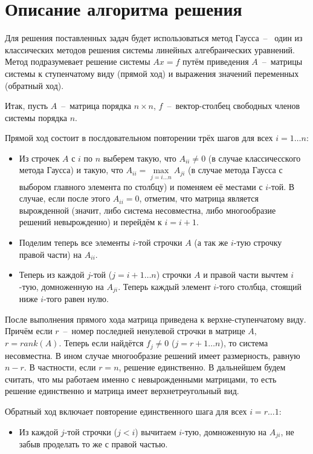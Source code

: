 \newpage
\section{Описание алгоритма решения}

Для решения поставленных задач будет использоваться метод Гаусса~--~
один из классических методов решения системы линейных алгебраических уравнений.
Метод подразумевает решение системы $Ax = f$ путём приведения $A$~--~матрицы системы
к ступенчатому виду (прямой ход) и выражения значений переменных (обратный ход).
\par

Итак, пусть $A$~--~матрица порядка $n \times n$, $f$~--~вектор-столбец свободных членов системы порядка $n$.
\par

Прямой ход состоит в послдовательном повторении трёх шагов для всех $i = 1 \ldots n$:
\begin{itemize}
    \item Из строчек $A$ с $i$ по $n$ выберем такую, что $A_{ii} \ne 0$ (в случае классичесского метода Гаусса) и
        такую, что $A_{ii} = \max\limits_{j=i \ldots n} A_{ji}$ (в случае метода Гаусса с выбором главного элемента по столбцу)
        и поменяем её местами с $i$-той. В случае, если после этого $A_{ii} = 0$, отметим, что матрица является вырожденной (значит, либо система несовместна, либо многообразие решений невырожденно)
        и перейдём к $i = i + 1$.
    \item Поделим теперь все элементы $i$-той строчки $A$ (а так же $i$-тую строчку правой части) на $A_{ii}$.
    \item Теперь из каждой $j$-той ($j = i + 1 \ldots n$) строчки $A$ и правой части вычтем $i$-тую, домноженную на $A_{ji}$.
        Теперь каждый элемент $i$-того столбца, стоящий ниже $i$-того равен нулю.
\end{itemize}
\par
После выполнения прямого хода матрица приведена к верхне-ступенчатому виду.
Причём если $r$~--~номер последней ненулевой строчки в матрице $A$, $r = rank(A)$.
Теперь если найдётся $f_j \ne 0$ ($j = r + 1 \ldots n$), то система несовместна.
В ином случае многообразие решений имеет размерность, равную $n - r$.
В частности, если $r = n$, решение единственно. В дальнейшем будем считать, что мы работаем именно с невырожденными матрицами,
то есть решение единственно и матрица имеет верхнетреугольный вид.
\par

Обратный ход включает повторение единственного шага для всех $i = r \ldots 1$:
\begin{itemize}
    \item Из каждой $j$-той строчки ($j < i$) вычитаем $i$-тую, домноженную на $A_{ji}$, не забыв проделать то же с правой частью.
\end{itemize}
\par

